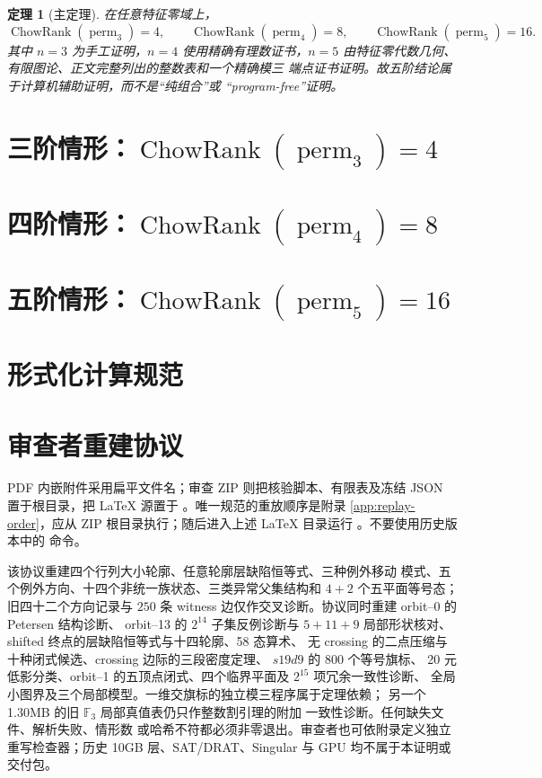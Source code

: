 \documentclass[10pt,a4paper,reqno]{amsart}
\newtheorem{theorem}{定理}[section]
\theoremstyle{definition}
\newcommand{\ChowRank}{\operatorname{ChowRank}}
\newcommand{\perm}{\operatorname{perm}}
\begin{document}
\begin{theorem}[主定理]\label{thm:main}
在任意特征零域上，
\[
 \ChowRank(\perm_3)=4,\qquad
 \ChowRank(\perm_4)=8,\qquad
 \ChowRank(\perm_5)=16.
\]
其中 \(n=3\) 为手工证明，\(n=4\) 使用精确有理数证书，\(n=5\)
由特征零代数几何、有限图论、正文完整列出的整数表和一个精确模三
端点证书证明。故五阶结论属于计算机辅助证明，而不是“纯组合”或
“program-free”证明。
\end{theorem}

\section{三阶情形：\texorpdfstring{$\ChowRank(\perm_3)=4$}{ChowRank(perm3)=4}}


\section{四阶情形：\texorpdfstring{$\ChowRank(\perm_4)=8$}{ChowRank(perm4)=8}}


\section{五阶情形：\texorpdfstring{$\ChowRank(\perm_5)=16$}{ChowRank(perm5)=16}}


\appendix
\section{形式化计算规范}


\section{审查者重建协议}

PDF 内嵌附件采用扁平文件名；审查 ZIP 则把核验脚本、有限表及冻结 JSON
置于根目录，把 LaTeX 源置于
。唯一规范的重放顺序是附录
\ref{app:replay-order}，应从 ZIP 根目录执行；随后进入上述 LaTeX
目录运行 。不要使用历史版本中的
 命令。

该协议重建四个行列大小轮廓、任意轮廓层缺陷恒等式、三种例外移动
模式、五个例外方向、十四个非统一族状态、三类异常父集结构和
\(4+2\) 个五平面等号态；
旧四十二个方向记录与 \(250\) 条 witness
边仅作交叉诊断。协议同时重建 orbit--0 的 Petersen 结构诊断、
orbit--13 的 \(2^{14}\) 子集反例诊断与 \(5+11+9\) 局部形状核对、
shifted 终点的层缺陷恒等式与十四轮廓、58 态算术、
无 crossing 的二点压缩与十种闭式候选、crossing 边际的三段密度定理、
\(s19d9\) 的 800 个等号旗标、
20 元低影分类、orbit--1 的五顶点闭式、四个临界平面及
\(2^{15}\) 项冗余一致性诊断、
全局小图界及三个局部模型。一维交旗标的独立模三程序属于定理依赖；
另一个 1.30MB 的旧 \(\mathbb F_3\) 局部真值表仍只作整数割引理的附加
一致性诊断。任何缺失文件、解析失败、情形数
或哈希不符都必须非零退出。审查者也可依附录定义独立重写检查器；历史
10GB 层、SAT/DRAT、Singular 与 GPU 均不属于本证明或交付包。
\end{document}
